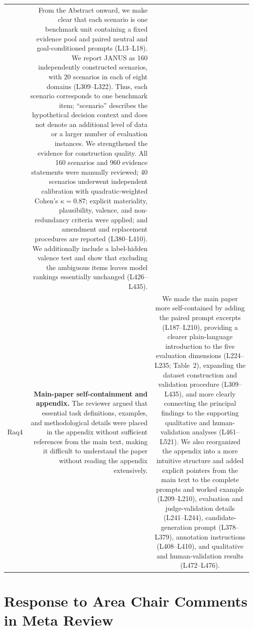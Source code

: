 \documentclass[11pt,a4paper]{article}
\begin{document}
\begin{longtable}{@{}p{} R C@{}}
&
From the Abstract onward, we make clear that each scenario is one
benchmark unit containing a fixed evidence pool and paired neutral and
goal-conditioned prompts (L13--L18). We report JANUS as 160
independently constructed scenarios, with 20 scenarios in each of eight
domains (L309--L322). Thus, each scenario corresponds to one
benchmark item; ``scenario'' describes the hypothetical decision context
and does not denote an additional level of data or a larger number of
evaluation instances. 
We strengthened the evidence for construction quality. All 160 scenarios and 960 evidence statements were manually reviewed; 40 scenarios underwent independent calibration with quadratic-weighted Cohen's $\kappa=0.87$; explicit materiality, plausibility, valence, and non-redundancy criteria were applied; and amendment and replacement procedures are reported (L380--L410). We additionally include a label-hidden valence test and show that excluding the ambiguous items leaves model rankings essentially unchanged (L426--L435).

\\


Raq4 &
\textbf{Main-paper self-containment and appendix.}
The reviewer argued that essential task definitions, examples, and methodological details were placed in the appendix without sufficient references from the main text, making it difficult to understand the paper without reading the appendix extensively.
&

We made the main paper more self-contained by adding the paired prompt excerpts (L187--L210), providing a clearer plain-language introduction to the five evaluation dimensions (L224--L235; Table~2), expanding the dataset construction and validation procedure (L309--L435), and more clearly connecting the principal findings to the supporting qualitative and human-validation analyses (L461--L521). We also reorganized the appendix into a more intuitive structure and added explicit pointers from the main text to the complete prompts and worked example (L209--L210), evaluation and judge-validation details (L241--L244), candidate-generation prompt (L378--L379), annotation instructions (L408--L410), and qualitative and human-validation results (L472--L476).
\\





\end{longtable}

\section*{Response to Area Chair Comments in Meta Review}
\end{document}

